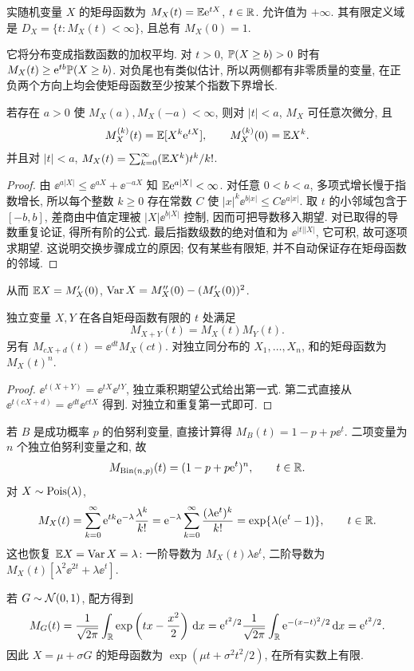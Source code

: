 \begin{definition}
实随机变量 $X$ 的矩母函数为 $M_X(t)=\mathbb E\mathrm e^{tX}$, $t\in\mathbb R$. 允许值为 $+\infty$. 其有限定义域是 $D_X=\{t:M_X(t)<\infty\}$, 且总有 $M_X(0)=1$.
\end{definition}
它将分布变成指数函数的加权平均. 对 $t>0$, $\mathbb P(X\ge b)>0$ 时有 $M_X(t)\ge\mathrm e^{tb}\mathbb P(X\ge b)$. 对负尾也有类似估计, 所以两侧都有非零质量的变量, 在正负两个方向上均会使矩母函数至少按某个指数下界增长.
\begin{theorem}[矩的生成]
若存在 $a>0$ 使 $M_X(a),M_X(-a)<\infty$, 则对 $|t|<a$, $M_X$ 可任意次微分, 且
\[M_X^{(k)}(t)=\mathbb E[X^k\mathrm e^{tX}],\qquad M_X^{(k)}(0)=\mathbb E X^k.\]
并且对 $|t|<a$,
$M_X(t)=\sum_{k=0}^\infty(\mathbb E X^k)t^k/k!$.
\end{theorem}
\begin{proof}
由 $\ee^{a|X|}\le\ee^{aX}+\ee^{-aX}$ 知 $\mathbb E\mathrm e^{a|X|}<\infty$. 对任意 $0<b<a$, 多项式增长慢于指数增长, 所以每个整数 $k\ge0$ 存在常数 $C$ 使
$|x|^k\ee^{b|x|}\le C\ee^{a|x|}$.
取 $t$ 的小邻域包含于 $[-b,b]$, 差商由中值定理被 $|X|\ee^{b|X|}$ 控制, 因而可把导数移入期望. 对已取得的导数重复论证, 得所有阶的公式. 最后指数级数的绝对值和为 $\ee^{|t||X|}$, 它可积, 故可逐项求期望. 这说明交换步骤成立的原因; 仅有某些有限矩, 并不自动保证存在矩母函数的邻域.
\end{proof}
从而 $\mathbb E X=M'_X(0)$, $\operatorname{Var} X=M''_X(0)-(M'_X(0))^2$.
\begin{proposition}[和与仿射变换]
独立变量 $X,Y$ 在各自矩母函数有限的 $t$ 处满足
\[M_{X+Y}(t)=M_X(t)M_Y(t).\]
另有 $M_{cX+d}(t)=\ee^{dt}M_X(ct)$. 对独立同分布的 $X_1,\ldots,X_n$, 和的矩母函数为 $M_X(t)^n$.
\end{proposition}
\begin{proof}
$\ee^{t(X+Y)}=\ee^{tX}\ee^{tY}$, 独立乘积期望公式给出第一式. 第二式直接从 $\ee^{t(cX+d)}=\ee^{dt}\ee^{ctX}$ 得到. 对独立和重复第一式即可.
\end{proof}

若 $B$ 是成功概率 $p$ 的伯努利变量, 直接计算得
$M_B(t)=1-p+p\ee^t$. 二项变量为 $n$ 个独立伯努利变量之和, 故
\[M_{\operatorname{Bin}(n,p)}(t)=(1-p+p\mathrm e^t)^n,\qquad t\in\mathbb R.\]
对 $X\sim\operatorname{Pois}(\lambda)$,
\[M_X(t)=\sum_{k=0}^\infty\mathrm e^{tk}\mathrm e^{-\lambda}\frac{\lambda^k}{k!}
=\mathrm e^{-\lambda}\sum_{k=0}^\infty\frac{(\lambda\mathrm e^t)^k}{k!}
=\exp\{\lambda(\mathrm e^t-1)\},\qquad t\in\mathbb R.\]
这也恢复 $\mathbb E X=\operatorname{Var} X=\lambda$: 一阶导数为 $M_X(t)\lambda\ee^t$, 二阶导数为 $M_X(t)[\lambda^2\ee^{2t}+\lambda\ee^t]$.

若 $G\sim\mathcal N(0,1)$, 配方得到
\[
M_G(t)=\frac1{\sqrt{2\pi}}\int_\mathbb R\exp\left(tx-\frac{x^2}2\right)\,\mathrm d x
=\mathrm e^{t^2/2}\frac1{\sqrt{2\pi}}\int_\mathbb R\mathrm e^{-(x-t)^2/2}\,\mathrm d x
=\mathrm e^{t^2/2}.
\]
因此 $X=\mu+\sigma G$ 的矩母函数为 $\exp(\mu t+\sigma^2t^2/2)$, 在所有实数上有限.

